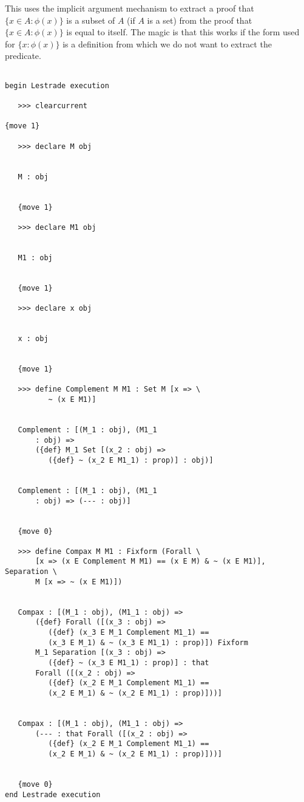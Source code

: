\documentclass[12pt]{article}
\begin{document}
This uses the implicit argument mechanism to extract a proof that $\{x \in A:\phi(x)\}$ is a subset of $A$ (if $A$ is a set) from the proof that $\{x \in A:\phi(x)\}$ is equal to itself.
The magic is that this works if the form used for $\{x : \phi(x)\}$ is a definition from which we do not want to extract the predicate.

\begin{verbatim}

begin Lestrade execution

   >>> clearcurrent

{move 1}

   >>> declare M obj


   M : obj


   {move 1}

   >>> declare M1 obj


   M1 : obj


   {move 1}

   >>> declare x obj


   x : obj


   {move 1}

   >>> define Complement M M1 : Set M [x => \
          ~ (x E M1)]


   Complement : [(M_1 : obj), (M1_1 
       : obj) => 
       ({def} M_1 Set [(x_2 : obj) => 
          ({def} ~ (x_2 E M1_1) : prop)] : obj)]


   Complement : [(M_1 : obj), (M1_1 
       : obj) => (--- : obj)]


   {move 0}

   >>> define Compax M M1 : Fixform (Forall \
       [x => (x E Complement M M1) == (x E M) & ~ (x E M1)], Separation \
       M [x => ~ (x E M1)])


   Compax : [(M_1 : obj), (M1_1 : obj) => 
       ({def} Forall ([(x_3 : obj) => 
          ({def} (x_3 E M_1 Complement M1_1) == 
          (x_3 E M_1) & ~ (x_3 E M1_1) : prop)]) Fixform 
       M_1 Separation [(x_3 : obj) => 
          ({def} ~ (x_3 E M1_1) : prop)] : that 
       Forall ([(x_2 : obj) => 
          ({def} (x_2 E M_1 Complement M1_1) == 
          (x_2 E M_1) & ~ (x_2 E M1_1) : prop)]))]


   Compax : [(M_1 : obj), (M1_1 : obj) => 
       (--- : that Forall ([(x_2 : obj) => 
          ({def} (x_2 E M_1 Complement M1_1) == 
          (x_2 E M_1) & ~ (x_2 E M1_1) : prop)]))]


   {move 0}
end Lestrade execution
\end{verbatim}
\end{document}
